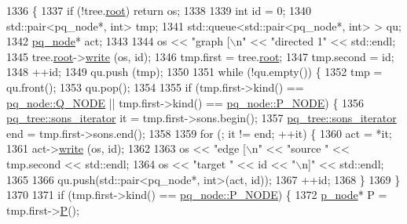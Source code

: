 \begin{DoxyCode}
1336 \{
1337     \textcolor{keywordflow}{if} (!tree.\mbox{\hyperlink{classpq__tree_ad8e4e2235fe68fb99769cec54e1760ba}{root}}) \textcolor{keywordflow}{return} os;
1338     
1339     \textcolor{keywordtype}{int} \textcolor{keywordtype}{id} = 0;
1340     std::pair<pq\_node*, int> tmp;
1341     std::queue<std::pair<pq\_node*, int> > qu;
1342     \mbox{\hyperlink{classpq__node}{pq\_node}}* act;
1343     
1344     os << \textcolor{stringliteral}{"graph [\(\backslash\)n"} << \textcolor{stringliteral}{"directed 1"} << std::endl;
1345     tree.\mbox{\hyperlink{classpq__tree_ad8e4e2235fe68fb99769cec54e1760ba}{root}}->\mbox{\hyperlink{classpq__node_aab7bddb053b6b25b90be00cba7de97f9}{write}} (os, \textcolor{keywordtype}{id});
1346     tmp.first = tree.\mbox{\hyperlink{classpq__tree_ad8e4e2235fe68fb99769cec54e1760ba}{root}};
1347     tmp.second = id;
1348     ++id;
1349     qu.push (tmp);
1350     
1351     \textcolor{keywordflow}{while} (!qu.empty()) \{
1352     tmp = qu.front();
1353     qu.pop();
1354     
1355     \textcolor{keywordflow}{if} (tmp.first->kind() == \mbox{\hyperlink{classpq__node_a96827bdca8bf81d20213405dd27f8fa6ae682b144f87217774df399363d0ef410}{pq\_node::Q\_NODE}} || tmp.first->kind() == 
      \mbox{\hyperlink{classpq__node_a96827bdca8bf81d20213405dd27f8fa6a0ea3d0eae8dd06c7039082054828ce77}{pq\_node::P\_NODE}}) \{
1356             \mbox{\hyperlink{structsymlist__iterator}{pq\_tree::sons\_iterator}} it = tmp.first->sons.begin();
1357             \mbox{\hyperlink{structsymlist__iterator}{pq\_tree::sons\_iterator}} end = tmp.first->sons.end();
1358         
1359         \textcolor{keywordflow}{for} (; it != end; ++it) \{
1360         act = *it;
1361         act->\mbox{\hyperlink{classpq__node_aab7bddb053b6b25b90be00cba7de97f9}{write}} (os, \textcolor{keywordtype}{id});
1362         
1363         os << \textcolor{stringliteral}{"edge [\(\backslash\)n"} << \textcolor{stringliteral}{"source "} << tmp.second << std::endl;
1364         os << \textcolor{stringliteral}{"target "} << \textcolor{keywordtype}{id} << \textcolor{stringliteral}{"\(\backslash\)n]"} << std::endl;
1365         
1366         qu.push(std::pair<pq\_node*, int>(act, \textcolor{keywordtype}{id}));
1367         ++id;
1368         \}
1369         \}
1370 
1371         \textcolor{keywordflow}{if} (tmp.first->kind() == \mbox{\hyperlink{classpq__node_a96827bdca8bf81d20213405dd27f8fa6a0ea3d0eae8dd06c7039082054828ce77}{pq\_node::P\_NODE}}) \{
1372             \mbox{\hyperlink{classp__node}{p\_node}}* P = tmp.first->\mbox{\hyperlink{classp__node_a4d8d7a171935a008f0718275dede2b43}{P}}();

\end{DoxyCode}
